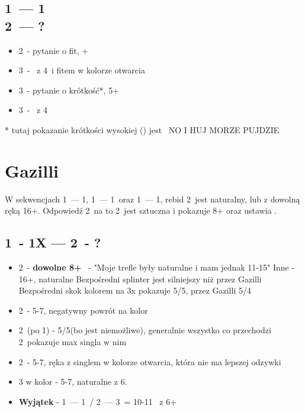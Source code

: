 \documentclass[12pt, a4paper]{article}
\begin{document}
\subsection{1\clubs\ --- 1\spades \\ 2\spades\ --- ?}
\begin{itemize}
    \item 2\nt\ - pytanie o fit, \inv+
    \item 3\clubs\ - \inv\ z 4\spades\ i fitem w kolorze otwarcia
    \item 3\diams\ - pytanie o krótkość*, 5+\spades
    \item 3\hearts\ - \gf\ z 4\spades
\end{itemize}
* tutaj pokazanie krótkości wysokiej (\hearts) jest \gf\ NO I HUJ MORZE PUJDZIE



\pagebreak
\section{Gazilli}
W sekwencjach 1\hearts\ --- 1\spades, 1\hearts\ --- 1\nt\ oraz 1\spades\ --- 1\nt, rebid 2\clubs\
jest naturalny, lub z dowolną ręką 16+. Odpowiedź 2\diams\ na to 2\clubs\ jest sztuczna i pokazuje 8+ oraz ustawia \gf.

\subsection{1\major\ - 1X --- 2\clubs\ - ?}
\begin{itemize} 
    \item 2\diams\ - \textbf{dowolne 8+}
    \major\ - "Moje trefle były naturalne i mam jednak 11-15"
    \subitem Inne - 16+, naturalne
    \subitem Bezpośredni splinter jest silniejszy niż przez Gazilli
    \subitem Bezpośredni skok kolorem na 3x pokazuje 5/5, przez Gazilli 5/4
    \item 2\major\ - 5-7, negatywny powrót na kolor
    \item 2\spades\ (po 1\hearts) - 5/5\minor (bo jest niemożliwe), 
    generalnie wszystko co przechodzi 2\major\ pokazuje max singla w nim
    \item 2\nt\ - 5-7, ręka z singlem w kolorze otwarcia, która nie ma lepszej odzywki
    \item 3 w kolor - 5-7, naturalne z 6.
    \item \textbf{Wyjątek} - 1\hearts\ --- 1\spades\ / 2\clubs\ --- 3\spades\ = 10-11 \inv\ z 6+\spades
\end{itemize}
\end{document}
